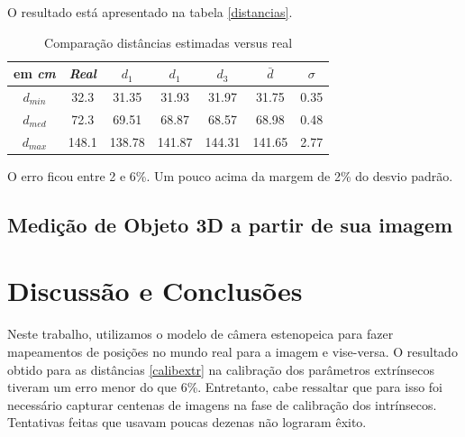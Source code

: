 \documentclass[conference]{IEEEtran}
\begin{document}
O resultado está apresentado na tabela \ref{distancias}.
\begin{table}[htbp]\label{distancias}
\caption{Comparação distâncias estimadas versus real}
\begin{center}
\begin{tabular}{|c|c|c|c|c|c|c|}
\hline
em \textit{cm}& \textbf{\textit{Real}}& \(d_{1}\)&\(d_{1}\)&\(d_{3}\)&\(\bar{d}\)& \textbf{\(\sigma\)} \\
\hline
\(d_{min}\)& 32.3& 31.35& 31.93 & 31.97& 31.75& 0.35\\
\hline
\(d_{med}\)& 72.3& 69.51& 68.87 & 68.57& 68.98& 0.48\\
\hline
\(d_{max}\)& 148.1& 138.78& 141.87 & 144.31& 141.65& 2.77\\
\hline

\end{tabular}
\label{tab1}
\end{center}
\end{table}
O erro ficou entre 2 e 6\%. Um pouco acima da margem de 2\% do desvio padrão.
\subsection{Medição de Objeto 3D a partir de sua imagem}
\section{Discussão e Conclusões}
Neste trabalho, utilizamos o modelo de câmera estenopeica para fazer mapeamentos de posições no mundo real para a imagem e vise-versa. O resultado obtido para as distâncias \ref{calibextr} na calibração dos parâmetros extrínsecos tiveram um erro menor do que 6\%. Entretanto, cabe ressaltar que para isso foi necessário capturar centenas de imagens na fase de calibração dos intrínsecos. Tentativas feitas que usavam poucas dezenas não lograram êxito. 




\end{document}
